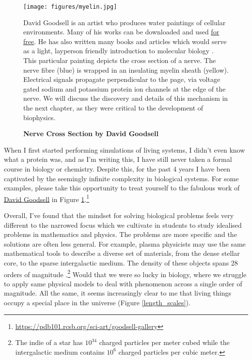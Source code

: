 \begin{figure}[h]
	\begin{center}
		\texttt{[image: figures/myelin.jpg]}
	\end{center}
	\captionsetup{singlelinecheck = false, justification=raggedright}
	\caption[Nerve Cross Section by David Goodsell] {\textbf{Nerve Cross Section by David Goodsell}}{David Goodsell is an artist who produces water paintings of cellular environments. Many of his works can be downloaded and used \href{https://pdb101.rcsb.org/sci-art/goodsell-gallery}{for free}. He has also written many books and articles which would serve as a light, layperson friendly introduction to molecular biology \cite{goodsell2009, goodsell2018, goodsell2020}. This particular painting depicts the cross section of a nerve. The nerve fibre (blue) is wrapped in an insulating myelin sheath (yellow). Electrical signals propagate perpendicular to the page, via voltage gated sodium and potassium protein ion channels at the edge of the nerve\cite{goodsell_nerve}. We will discuss the discovery and details of this mechanism in the next chapter, as they were critical to the development of biophysics.}
	\label{goodsell_figure}
\end{figure}

When I first started performing simulations of living systems, I didn't even know what a protein was, and as I'm writing this, I have still never taken a formal course in biology or chemistry. Despite this, for the past 4 years I have been captivated by the seemingly infinite complexity in biological systems. For some examples, please take this opportunity to treat yourself to the fabulous work of \href {https://pdb101.rcsb.org/sci-art/goodsell-gallery}{David Goodsell} in Figure \ref{goodsell_figure}.\footnote{\href{https://pdb101.rcsb.org/sci-art/goodsell-gallery}{https://pdb101.rcsb.org/sci-art/goodsell-gallery}} 

Overall, I've found that the mindset for solving biological problems feels very different to the narrowed focus which we cultivate in students to study idealised problems in mathematics and physics. The problems are more specific and the solutions are often less general. For example, plasma physicists may use the same mathematical tools to describe a diverse set of materials, from the dense stellar core, to the sparse intergalactic medium. The density of these objects spans 28 orders of magnitude \cite{chen2018}.\footnote{The indie of a star has $10^{34} $ charged particles per meter cubed while the intergalactic medium contains $10^6$ charged particles per cubic meter.} Would that we were so lucky in biology, where we struggle to apply same physical models to deal with phenomenon across a single order of magnitude. All the same, it seems increasingly clear to me that living things occupy a special place in the universe (Figure \ref{length_scales}). 


